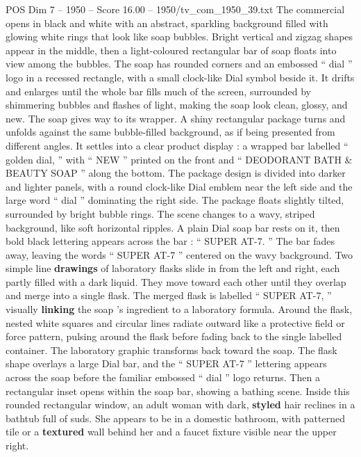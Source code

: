 \begin{textsample}{POS Dim 7 – 1950 – Score 16.00 – 1950/tv\_com\_1950\_39.txt}  \label{ex:f7_pos_010}
The commercial opens in black and white with an abstract, sparkling background filled with glowing white rings that look like soap bubbles.
Bright vertical and zigzag shapes appear in the middle, then a light-coloured rectangular bar of soap floats into view among the bubbles.
The soap has rounded corners and an embossed “ dial ” logo in a recessed rectangle, with a small clock-like Dial symbol beside it.
It drifts and enlarges until the whole bar fills much of the screen, surrounded by shimmering bubbles and flashes of light, making the soap look clean, glossy, and new.
The soap gives way to its wrapper.
A shiny rectangular package turns and unfolds against the same bubble-filled background, as if being presented from different angles.
It settles into a clear product display : a wrapped bar labelled “ golden dial, ” with “ NEW ” printed on the front and “ DEODORANT BATH \& BEAUTY SOAP ” along the bottom.
The package design is divided into darker and lighter panels, with a round clock-like Dial emblem near the left side and the large word “ dial ” dominating the right side.
The package floats slightly tilted, surrounded by bright bubble rings.
The scene changes to a wavy, striped background, like soft horizontal ripples.
A plain Dial soap bar rests on it, then bold black lettering appears across the bar : “ SUPER AT-7. ” The bar fades away, leaving the words “ SUPER AT-7 ” centered on the wavy background.
Two simple line \textbf{drawings} of laboratory flasks slide in from the left and right, each partly filled with a dark liquid.
They move toward each other until they overlap and merge into a single flask.
The merged flask is labelled “ SUPER AT-7, ” visually \textbf{linking} the soap ’s ingredient to a laboratory formula.
Around the flask, nested white squares and circular lines radiate outward like a protective field or force pattern, pulsing around the flask before fading back to the single labelled container.
The laboratory graphic transforms back toward the soap.
The flask shape overlays a large Dial bar, and the “ SUPER AT-7 ” lettering appears across the soap before the familiar embossed “ dial ” logo returns.
Then a rectangular inset opens within the soap bar, showing a bathing scene.
Inside this rounded rectangular window, an adult woman with dark, \textbf{styled} hair reclines in a bathtub full of suds.
She appears to be in a domestic bathroom, with patterned tile or a \textbf{textured} wall behind her and a faucet fixture visible near the upper right.

\end{textsample}
